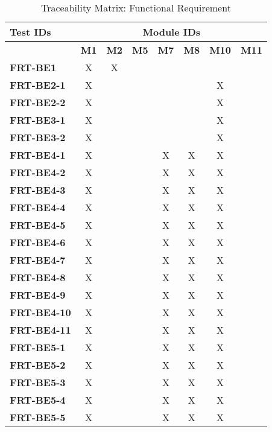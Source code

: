 \documentclass[12pt, titlepage]{article}
\begin{document}
\begin{table}[H]
    \centering
    \caption{Traceability Matrix: Functional Requirement}
    \begin{adjustbox}{max width=0.6\paperwidth}
    \begin{tabular}{l|ccccccc}
        \textbf{Test IDs} & \multicolumn{7}{c}{\textbf{Module IDs}}\\
        \hline
        ~ & \textbf{M1} & \textbf{M2} & \textbf{M5} & \textbf{M7} & \textbf{M8} & \textbf{M10} & \textbf{M11}\\
        \textbf{FRT-BE1}    & X & X & ~ & ~ & ~ & ~ & ~\\
        \textbf{FRT-BE2-1}  & X & ~ & ~ & ~ & ~ & X & ~\\
        \textbf{FRT-BE2-2}  & X & ~ & ~ & ~ & ~ & X & ~\\
        \textbf{FRT-BE3-1}  & X & ~ & ~ & ~ & ~ & X & ~\\
        \textbf{FRT-BE3-2}  & X & ~ & ~ & ~ & ~ & X & ~\\
        \textbf{FRT-BE4-1}  & X & ~ & ~ & X & X & X & ~\\
        \textbf{FRT-BE4-2}  & X & ~ & ~ & X & X & X & ~\\
        \textbf{FRT-BE4-3}  & X & ~ & ~ & X & X & X & ~\\
        \textbf{FRT-BE4-4}  & X & ~ & ~ & X & X & X & ~\\
        \textbf{FRT-BE4-5}  & X & ~ & ~ & X & X & X & ~\\
        \textbf{FRT-BE4-6}  & X & ~ & ~ & X & X & X & ~\\
        \textbf{FRT-BE4-7}  & X & ~ & ~ & X & X & X & ~\\
        \textbf{FRT-BE4-8}  & X & ~ & ~ & X & X & X & ~\\
        \textbf{FRT-BE4-9}  & X & ~ & ~ & X & X & X & ~\\
        \textbf{FRT-BE4-10} & X & ~ & ~ & X & X & X & ~\\
        \textbf{FRT-BE4-11} & X & ~ & ~ & X & X & X & ~\\
        \textbf{FRT-BE5-1}  & X & ~ & ~ & X & X & X & ~\\
        \textbf{FRT-BE5-2}  & X & ~ & ~ & X & X & X & ~\\
        \textbf{FRT-BE5-3}  & X & ~ & ~ & X & X & X & ~\\
        \textbf{FRT-BE5-4}  & X & ~ & ~ & X & X & X & ~\\
        \textbf{FRT-BE5-5}  & X & ~ & ~ & X & X & X & ~\\

\end{tabular}
\end{adjustbox}
\end{table}
\end{document}
